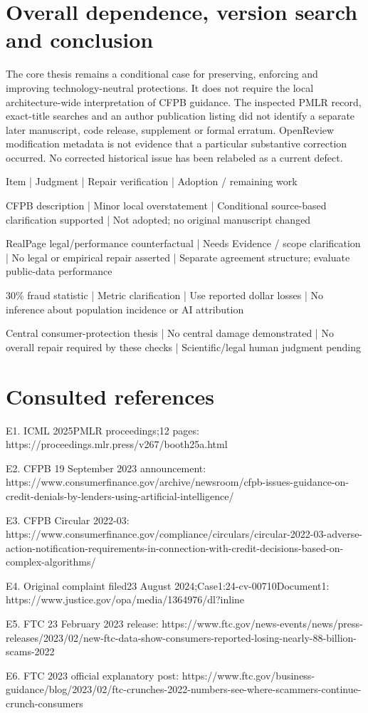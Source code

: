 \documentclass[10pt]{article}
\begin{document}
\section*{Overall dependence, version search and conclusion}
The core thesis remains a conditional case for preserving, enforcing and improving technology-neutral protections. It does not require the local architecture-wide interpretation of CFPB guidance. The inspected PMLR record, exact-title searches and an author publication listing did not identify a separate later manuscript, code release, supplement or formal erratum. OpenReview modification metadata is not evidence that a particular substantive correction occurred. No corrected historical issue has been relabeled as a current defect.\par
Item | Judgment | Repair verification | Adoption / remaining work\par
CFPB description | Minor local overstatement | Conditional source-based clarification supported | Not adopted; no original manuscript changed\par
RealPage legal/performance counterfactual | Needs Evidence / scope clarification | No legal or empirical repair asserted | Separate agreement structure; evaluate public-data performance\par
30\% fraud statistic | Metric clarification | Use reported dollar losses | No inference about population incidence or AI attribution\par
Central consumer-protection thesis | No central damage demonstrated | No overall repair required by these checks | Scientific/legal human judgment pending\par
\section*{Consulted references}
E1. ICML 2025PMLR proceedings;12 pages: https://proceedings.mlr.press/v267/booth25a.html\par
E2. CFPB 19 September 2023 announcement: https://www.consumerfinance.gov/archive/newsroom/cfpb-issues-guidance-on-credit-denials-by-lenders-using-artificial-intelligence/\par
E3. CFPB Circular 2022-03: https://www.consumerfinance.gov/compliance/circulars/circular-2022-03-adverse-action-notification-requirements-in-connection-with-credit-decisions-based-on-complex-algorithms/\par
E4. Original complaint filed23 August 2024;Case1:24-cv-00710Document1: https://www.justice.gov/opa/media/1364976/dl?inline\par
E5. FTC 23 February 2023 release: https://www.ftc.gov/news-events/news/press-releases/2023/02/new-ftc-data-show-consumers-reported-losing-nearly-88-billion-scams-2022\par
E6. FTC 2023 official explanatory post: https://www.ftc.gov/business-guidance/blog/2023/02/ftc-crunches-2022-numbers-see-where-scammers-continue-crunch-consumers\par
\end{document}
